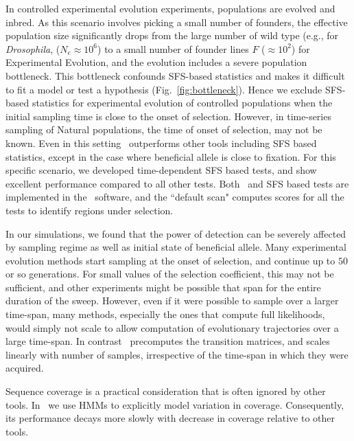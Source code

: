 \documentclass[11pt]{article}
\def\comale{\text{{\sc Comale}}}
\begin{document}
In controlled experimental evolution experiments, populations are
evolved and inbred. As this scenario involves picking a small number
of founders, the effective population size significantly drops from
the large number of wild type (e.g., for \emph{Drosophila},
($N_e\approx10^6$) to a small number of founder lines $F$ ($\approx
10^2$) for Experimental Evolution, and the evolution includes a severe
population bottleneck. This bottleneck confounds SFS-based statistics
and makes it difficult to fit a model or test a hypothesis
(Fig.~\ref{fig:bottleneck}).  Hence we exclude SFS-based statistics
for experimental evolution of controlled populations when the initial
sampling time is close to the onset of selection. However, in
time-series sampling of Natural populations, the time of onset of
selection, may not be known. Even in this setting \comale\ outperforms
other tools including SFS based statistics, except in the case where
beneficial allele is close to fixation. For this specific scenario, we
developed time-dependent SFS based tests, and show excellent
performance compared to all other tests. Both \comale\ and SFS based tests 
are implemented in the \comale\ software, and the ``default scan" computes 
scores for all the tests to identify regions under selection.
	

In our simulations, we found that the power of detection can be
severely affected by sampling regime as well as initial state of
beneficial allele. Many experimental evolution methods start sampling
at the onset of selection, and continue up to $50$ or so
generations. For small values of the selection coefficient, this may
not be sufficient, and other experiments might be possible that span
for the entire duration of the sweep. However, even if it were
possible to sample over a larger time-span, many methods, especially
the ones that compute full likelihoods, would simply not scale to
allow computation of evolutionary trajectories over a large
time-span. In contrast \comale\ precomputes the transition matrices,
and scales linearly with number of samples, irrespective of the
time-span in which they were acquired.

Sequence coverage is a practical consideration that is often ignored
by other tools.  In \comale\ we use HMMs to explicitly model variation
in coverage. Consequently, its performance decays more slowly with
decrease in coverage relative to other tools.
\end{document}
